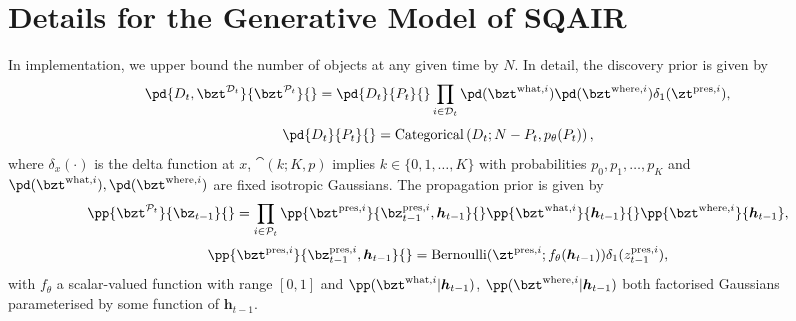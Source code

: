 \section{Details for the Generative Model of SQAIR} 
\label{apd:sqair_generation}

In implementation, we upper bound the number of objects at any given time by $N$.
In detail, the discovery prior is given by
\begin{equation} \label{eq:disc_prior}
    \pd{D_t,\bzt^{\mathcal{D}_t}}{\bzt^{\mathcal{P}_t}}{} 
     = \pd{D_t}{P_t}{} \prod_{i \in \mathcal{D}_t} \pd(\bzt^{\mathrm{what}, i})\pd(\bzt^{\mathrm{where}, i}) \delta_1(\zt^{\mathrm{pres},i}),
\end{equation}
\begin{equation} \label{eq:disc_step_prior}
    \pd{D_t}{P_t}{}=\cat \left(D_t; N-P_t,p_{\theta}(P_t)\right),
\end{equation}
where $\delta_x(\cdot)$ is the delta function at $x$, $\cat(k;K,p)$ implies $k \in \{0, 1, \ldots ,K\}$ with probabilities $p_0,p_1,\ldots,p_K$ and $\pd(\bzt^{\mathrm{what}, i}),\pd(\bzt^{\mathrm{where}, i})$ are fixed isotropic Gaussians.
The propagation prior is given by 
\begin{equation} \label{eq:prop_prior}
    \pp{\bzt^{\mathcal{P}_t}}{\bz_{t-1}}{}
     = \prod_{i \in \mathcal{P}_t} \pp{\bzt^{\mathrm{pres},i}}{\bz_{t-1}^{\mathrm{pres},i}, \bm{h}_{t-1}}{} \pp{\bzt^{\mathrm{what}, i}}{\bm{h}_{t-1}}{} \pp{\bzt^{\mathrm{where}, i}}{\bm{h}_{t-1}},
\end{equation}
\begin{equation} \label{eq:prop_pres_prior}
    \pp{\bzt^{\mathrm{pres},i}}{\bz_{t-1}^{\mathrm{pres},i}, \bm{h}_{t-1}}{}
     = \bern (\zt^{\mathrm{pres},i}; f_{\theta}(\bm{h}_{t-1})) \delta_1 (z_{t-1}^{\mathrm{pres},i}),
\end{equation}
with $f_{\theta}$ a scalar-valued function with range $[0,1]$ and $\pp(\bzt^{\mathrm{what}, i}|\bm{h}_{t-1}) $, $\pp(\bzt^{\mathrm{where}, i}|\bm{h}_{t-1})$ both factorised Gaussians parameterised by some function of $\bm{h}_{t-1}$.


